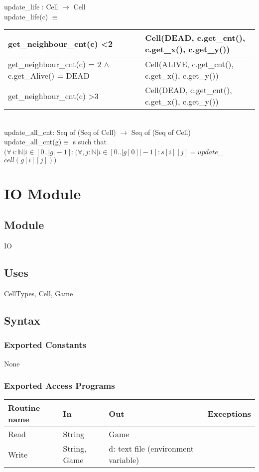 \documentclass[]{article}
\begin{document}
\noindent update\_life : Cell $\rightarrow$ Cell \\
\noindent update\_life(c) $\equiv$ \\

\begin{table}[h]
\begin{tabular}{|l|l|}
\hline
get\_neighbour\_cnt(c) \textless 2                       & Cell(DEAD, c.get\_cnt(), c.get\_x(), c.get\_y())  \\ \hline
get\_neighbour\_cnt(c) = 2 $\land$ c.get\_Alive() = DEAD & Cell(ALIVE, c.get\_cnt(), c.get\_x(), c.get\_y()) \\ \hline
get\_neighbour\_cnt(c) \textgreater 3                    & Cell(DEAD, c.get\_cnt(), c.get\_x(), c.get\_y())  \\ \hline
\end{tabular}
\end{table}

\\
\noindent update\_all\_cnt: Seq of (Seq of Cell) $\rightarrow$ Seq of (Seq of Cell)
\\
\noindent update\_all\_cnt(g)$\equiv$ s such that $(\forall\, i: \mathbb{N} | i \in [0..|g| - 1] :
  (\forall, j: \mathbb{N} | i \in [0..|g[0]| - 1]: s[i][j] = update$\_$cell(g[i][j]))$

\newpage

\section*{IO Module}
\subsection*{Module}
IO

\subsection*{Uses}
CellTypes, Cell, Game

\subsection*{Syntax}
\subsubsection*{Exported Constants}
None

\subsubsection*{Exported Access Programs}
\begin{tabular}{| l | l | l | p{5cm} |}
\hline
\textbf{Routine name} & \textbf{In} & \textbf{Out} & \textbf{Exceptions}\\
\hline
Read & String & Game & \\
\hline
Write & String, Game  & d: text file (environment variable) &  \\
\hline

\end{tabular}
\end{document}
